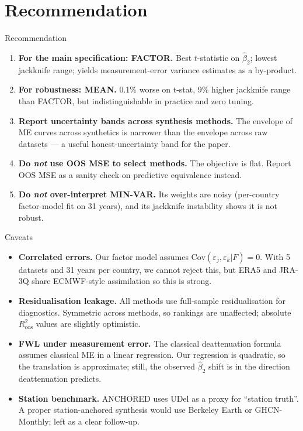 \documentclass[10pt,aspectratio=169]{beamer}
\begin{document}
\section{Recommendation}

\begin{frame}{Recommendation}
  \begin{enumerate}
    \item \textbf{For the main specification: FACTOR.}
          Best $t$-statistic on $\hat\beta_2$; lowest jackknife range;
          yields measurement-error variance estimates as a by-product.
    \item \textbf{For robustness: MEAN.}
          0.1\% worse on t-stat, 9\% higher jackknife range than FACTOR,
          but indistinguishable in practice and zero tuning.
    \item \textbf{Report uncertainty bands across synthesis methods.}
          The envelope of ME curves across synthetics is narrower than the
          envelope across raw datasets --- a useful honest-uncertainty band
          for the paper.
    \item \textbf{Do \emph{not} use OOS MSE to select methods.} The
          objective is flat.  Report OOS MSE as a sanity check on
          predictive equivalence instead.
    \item \textbf{Do \emph{not} over-interpret MIN-VAR.} Its weights are
          noisy (per-country factor-model fit on 31 years), and its
          jackknife instability shows it is not robust.
  \end{enumerate}
\end{frame}

\begin{frame}{Caveats}
  \begin{itemize}
    \item \textbf{Correlated errors.} Our factor model assumes
          $\mathrm{Cov}(\varepsilon_j, \varepsilon_k | F) = 0$.  With 5 datasets
          and 31 years per country, we cannot reject this, but ERA5 and
          JRA-3Q share ECMWF-style assimilation so this is strong.
    \item \textbf{Residualisation leakage.} All methods use
          full-sample residualisation for diagnostics. Symmetric across
          methods, so rankings are unaffected; absolute $R^2_{\text{oos}}$
          values are slightly optimistic.
    \item \textbf{FWL under measurement error.} The classical deattenuation
          formula assumes classical ME in a linear regression. Our
          regression is quadratic, so the translation is approximate;
          still, the observed $\hat\beta_2$ shift is in the direction
          deattenuation predicts.
    \item \textbf{Station benchmark.} ANCHORED uses UDel as a proxy for
          ``station truth''. A proper station-anchored synthesis would use
          Berkeley Earth or GHCN-Monthly; left as a clear follow-up.
  \end{itemize}
\end{frame}
\end{document}
